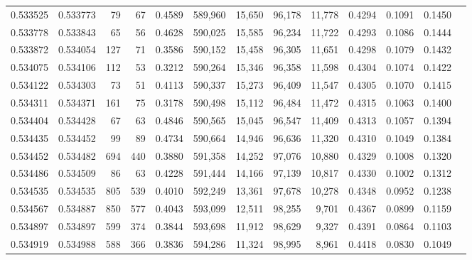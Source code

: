 \begin{tabular}{rrrrrrrrrrrrr}
0.533525 & 0.533773 &    79 &    67 &                                     0.4589 & 589,960 &  15,650 &  96,178 &  11,778 & 0.4294 & 0.1091 & 0.1450 \\
0.533778 & 0.533843 &    65 &    56 &                                     0.4628 & 590,025 &  15,585 &  96,234 &  11,722 & 0.4293 & 0.1086 & 0.1444 \\
0.533872 & 0.534054 &   127 &    71 &                                     0.3586 & 590,152 &  15,458 &  96,305 &  11,651 & 0.4298 & 0.1079 & 0.1432 \\
0.534075 & 0.534106 &   112 &    53 &                                     0.3212 & 590,264 &  15,346 &  96,358 &  11,598 & 0.4304 & 0.1074 & 0.1422 \\
0.534122 & 0.534303 &    73 &    51 &                                     0.4113 & 590,337 &  15,273 &  96,409 &  11,547 & 0.4305 & 0.1070 & 0.1415 \\
0.534311 & 0.534371 &   161 &    75 &                                     0.3178 & 590,498 &  15,112 &  96,484 &  11,472 & 0.4315 & 0.1063 & 0.1400 \\
0.534404 & 0.534428 &    67 &    63 &                                     0.4846 & 590,565 &  15,045 &  96,547 &  11,409 & 0.4313 & 0.1057 & 0.1394 \\
0.534435 & 0.534452 &    99 &    89 &                                     0.4734 & 590,664 &  14,946 &  96,636 &  11,320 & 0.4310 & 0.1049 & 0.1384 \\
0.534452 & 0.534482 &   694 &   440 &                                     0.3880 & 591,358 &  14,252 &  97,076 &  10,880 & 0.4329 & 0.1008 & 0.1320 \\
0.534486 & 0.534509 &    86 &    63 &                                     0.4228 & 591,444 &  14,166 &  97,139 &  10,817 & 0.4330 & 0.1002 & 0.1312 \\
0.534535 & 0.534535 &   805 &   539 &                                     0.4010 & 592,249 &  13,361 &  97,678 &  10,278 & 0.4348 & 0.0952 & 0.1238 \\
0.534567 & 0.534887 &   850 &   577 &                                     0.4043 & 593,099 &  12,511 &  98,255 &   9,701 & 0.4367 & 0.0899 & 0.1159 \\
0.534897 & 0.534897 &   599 &   374 &                                     0.3844 & 593,698 &  11,912 &  98,629 &   9,327 & 0.4391 & 0.0864 & 0.1103 \\
0.534919 & 0.534988 &   588 &   366 &                                     0.3836 & 594,286 &  11,324 &  98,995 &   8,961 & 0.4418 & 0.0830 & 0.1049 \\

\end{tabular}
